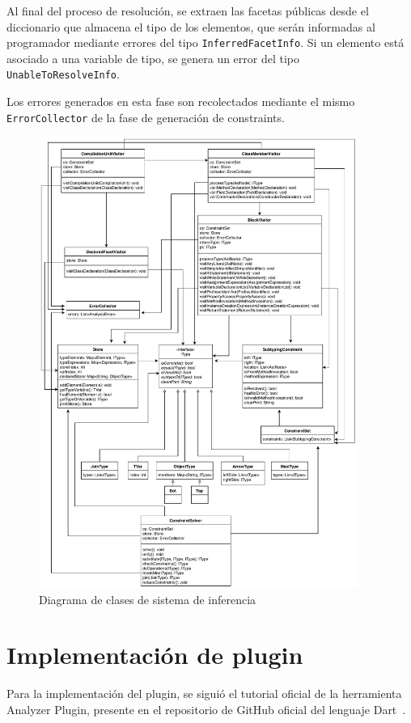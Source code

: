 Al final del proceso de resolución, se extraen las facetas públicas desde el diccionario que almacena el tipo de los elementos, que serán informadas al programador mediante errores del tipo \texttt{InferredFacetInfo}. Si un elemento está asociado a una variable de tipo, se genera un error del tipo \texttt{UnableToResolveInfo}.

Los errores generados en esta fase son recolectados mediante el mismo \texttt{ErrorCollector} de la fase de generación de constraints.

\begin{figure}[ht]
  \centering
  \includegraphics[width=0.93\textwidth]{imagenes/others.pdf}
  \caption{Diagrama de clases de sistema de inferencia}
  \label{uml}
\end{figure}
\clearpage

\section{Implementación de plugin}
Para la implementación del plugin, se siguió el tutorial oficial de la herramienta Analyzer Plugin, presente en el repositorio de GitHub oficial del lenguaje Dart~\cite{plugin}.

